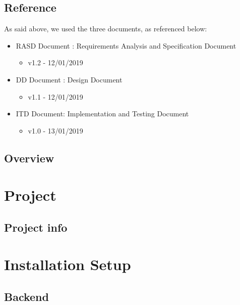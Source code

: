 \documentclass{article}
\begin{document}
\subsection{Reference} 
	As said above, we used the three documents, as referenced below:
	\begin{itemize}
		\item RASD Document : Requirements Analysis and Specification Document
		\begin{itemize}			\item v1.2 - 12/01/2019		\end{itemize}	
		\item DD Document : Design Document
		\begin{itemize}			\item v1.1 - 12/01/2019		\end{itemize}	
		\item ITD Document: Implementation and Testing Document
		\begin{itemize}			\item v1.0 - 13/01/2019		\end{itemize}	
	\end{itemize}
\subsection{Overview} 

\section{Project}
\subsection{Project info}


\newpage
\section{Installation Setup}
\subsection{Backend }
\end{document}
